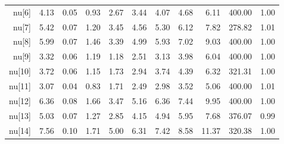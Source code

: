 \begin{longtable}{rrrrrrrrrrr}
  nu[6] & 4.13 & 0.05 & 0.93 & 2.67 & 3.44 & 4.07 & 4.68 & 6.11 & 400.00 & 1.00 \\ 
  nu[7] & 5.42 & 0.07 & 1.20 & 3.45 & 4.56 & 5.30 & 6.12 & 7.82 & 278.82 & 1.01 \\ 
  nu[8] & 5.99 & 0.07 & 1.46 & 3.39 & 4.99 & 5.93 & 7.02 & 9.03 & 400.00 & 1.00 \\ 
  nu[9] & 3.32 & 0.06 & 1.19 & 1.18 & 2.51 & 3.13 & 3.98 & 6.04 & 400.00 & 1.00 \\ 
  nu[10] & 3.72 & 0.06 & 1.15 & 1.73 & 2.94 & 3.74 & 4.39 & 6.32 & 321.31 & 1.00 \\ 
  nu[11] & 3.07 & 0.04 & 0.83 & 1.71 & 2.49 & 2.98 & 3.52 & 5.06 & 400.00 & 1.01 \\ 
  nu[12] & 6.36 & 0.08 & 1.66 & 3.47 & 5.16 & 6.36 & 7.44 & 9.95 & 400.00 & 1.00 \\ 
  nu[13] & 5.03 & 0.07 & 1.27 & 2.85 & 4.15 & 4.94 & 5.95 & 7.68 & 376.07 & 0.99 \\ 
  nu[14] & 7.56 & 0.10 & 1.71 & 5.00 & 6.31 & 7.42 & 8.58 & 11.37 & 320.38 & 1.00 \\ 
   \hline
\hline
\end{longtable}
